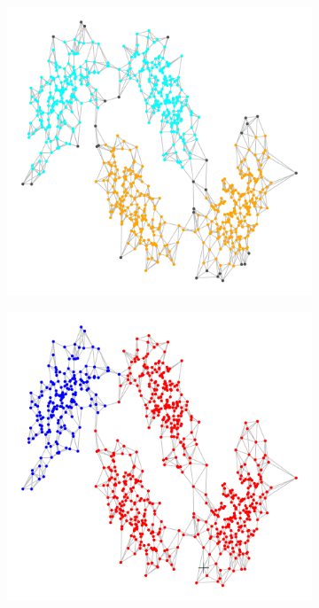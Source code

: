 \documentclass{article}
\newcommand{\1}{\mathbf{1}}
\theoremstyle{aldenthm}
\begin{document}
\begin{figure}
	\centering
	\begin{adjustbox}{minipage=\linewidth,scale=0.8}
		\begin{subfigure}{.24\linewidth}
			\includegraphics[width=\linewidth,scale = .5]{example3plots/true_density_cluster}
			\caption{}
		\end{subfigure}
		\begin{subfigure}{.24\linewidth}
			\includegraphics[width=\linewidth,scale = .5]{example3plots/ppr_cluster}

\end{subfigure}
\end{adjustbox}
\end{figure}
\end{document}
